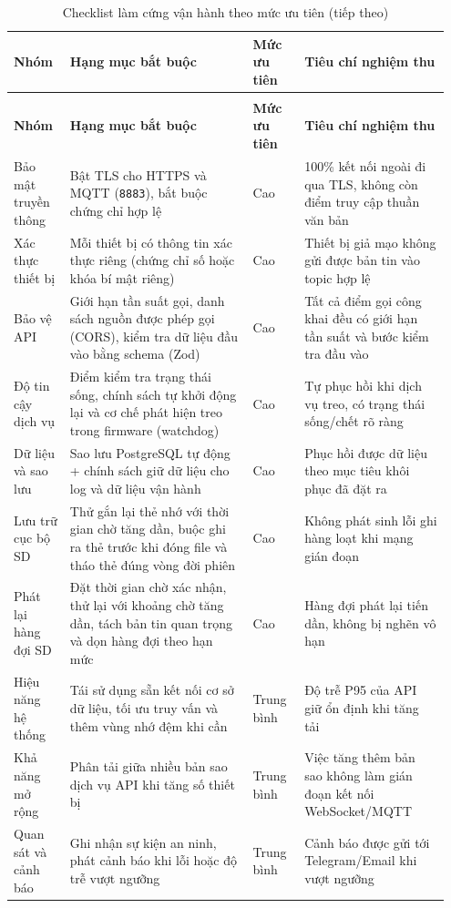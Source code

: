 \documentclass[a4paper]{extarticle}
\newcommand{\thesissettableid}[2]{%
  \renewcommand{\thetable}{#1}%
  \renewcommand{\theHtable}{#2}%
}
\begin{document}
{\thesissettableid{4.11}{tab-ch4-checklist-hardening-production-theo-muc-uu-tien}
\def\LTcaptype{table}
\begin{longtable}{|L{0.125\linewidth}|L{0.396\linewidth}|L{0.115\linewidth}|L{0.318\linewidth}|}
\caption{Checklist làm cứng vận hành theo mức ưu tiên}\label{tab:ch4-checklist-hardening-production-theo-muc-uu-tien}\\
\hline \textbf{Nhóm} & \textbf{Hạng mục bắt buộc} & \textbf{Mức ưu tiên} & \textbf{Tiêu chí nghiệm thu} \\
\hline
\endfirsthead
\caption[]{Checklist làm cứng vận hành theo mức ưu tiên (tiếp theo)}\\
\hline \textbf{Nhóm} & \textbf{Hạng mục bắt buộc} & \textbf{Mức ưu tiên} & \textbf{Tiêu chí nghiệm thu} \\
\hline
\endhead
\hline
\endfoot
\endlastfoot
Bảo mật truyền thông & Bật TLS cho HTTPS và MQTT (\texttt{8883}), bắt
buộc chứng chỉ hợp lệ & Cao & 100\% kết nối ngoài đi qua TLS, không còn
điểm truy cập thuần văn bản \\\hline
Xác thực thiết bị & Mỗi thiết bị có thông tin xác thực riêng
(chứng chỉ số hoặc khóa bí mật riêng) & Cao & Thiết bị giả mạo không gửi
được bản tin vào topic hợp lệ \\\hline
Bảo vệ API & Giới hạn tần suất gọi, danh sách nguồn được phép gọi
(CORS), kiểm tra dữ liệu đầu vào bằng schema (Zod) & Cao & Tất cả điểm
gọi công khai đều có giới hạn tần suất và bước kiểm tra đầu vào \\\hline
Độ tin cậy dịch vụ & Điểm kiểm tra trạng thái sống, chính sách tự khởi
động lại và cơ chế phát hiện treo trong firmware (watchdog) & Cao & Tự
phục hồi khi dịch vụ treo, có trạng thái sống/chết rõ ràng \\\hline
Dữ liệu và sao lưu & Sao lưu PostgreSQL tự động + chính sách giữ dữ liệu
cho log và dữ liệu vận hành & Cao & Phục hồi được dữ liệu theo mục tiêu
khôi phục đã đặt ra \\\hline
Lưu trữ cục bộ SD & Thử gắn lại thẻ nhớ với thời gian chờ tăng dần,
buộc ghi ra thẻ trước khi đóng file và tháo thẻ đúng vòng đời phiên &
Cao & Không phát sinh lỗi ghi hàng loạt khi mạng gián đoạn \\\hline
Phát lại hàng đợi SD & Đặt thời gian chờ xác nhận, thử lại với khoảng
chờ tăng dần, tách bản tin quan trọng và dọn hàng đợi theo hạn mức &
Cao & Hàng đợi phát lại tiến dần, không bị nghẽn vô hạn \\\hline
Hiệu năng hệ thống & Tái sử dụng sẵn kết nối cơ sở dữ liệu, tối ưu truy
vấn và thêm vùng nhớ đệm khi cần & Trung bình & Độ trễ P95 của API giữ
ổn định khi tăng tải \\\hline
Khả năng mở rộng & Phân tải giữa nhiều bản sao dịch vụ API khi tăng số
thiết bị & Trung bình & Việc tăng thêm bản sao không làm gián đoạn kết nối
WebSocket/MQTT \\\hline
Quan sát và cảnh báo & Ghi nhận sự kiện an ninh, phát cảnh báo khi lỗi
hoặc độ trễ vượt ngưỡng & Trung bình & Cảnh báo được gửi tới Telegram/Email khi vượt
ngưỡng \\\hline
\end{longtable}
}
\end{document}
